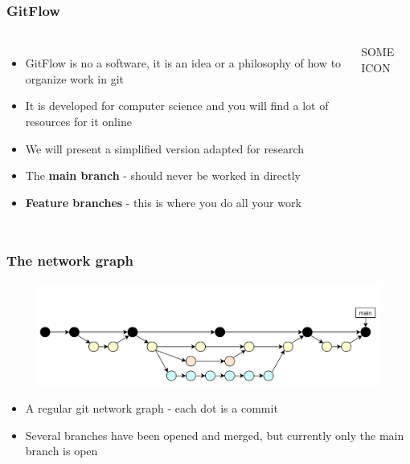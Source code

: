 \documentclass[aspectratio=169]{beamer} %
\begin{document}
\begin{frame}
	\frametitle{GitFlow}
	\begin{columns}[c]
		
		\begin{itemize}
			\setlength\itemsep{.5em}
			\item GitFlow is no a software, it is an idea or a philosophy of how to organize work in git
			\item It is developed for computer science and you will find a lot of resources for it online 
			\item We will present a simplified version adapted for research
			\item The \textbf{main branch} - should never be worked in directly
			\item \textbf{Feature branches} - this is where you do all your work
		\end{itemize}
	
		\vspace{-.75cm}
		\Large SOME ICON
	\end{columns}
\end{frame}

\begin{frame}
	\frametitle{The network graph}
	
	\vspace{-.5cm}
	\begin{minipage}[t][5cm][t]{\textwidth}
		\begin{figure}
			\centering
			\includegraphics[width=\textwidth]{./img/dime-gitflow-network.png}
		\end{figure}
	\end{minipage}  
	
	\vspace{-.5cm}
	\begin{minipage}[t][5cm][t]{\textwidth}
		\begin{itemize}
			\setlength\itemsep{.5em}
			\item A regular git network graph - each dot is a commit
			\item Several branches have been opened and merged, but currently only the main branch is open
		\end{itemize}
	\end{minipage}  

\end{frame}
\end{document}
